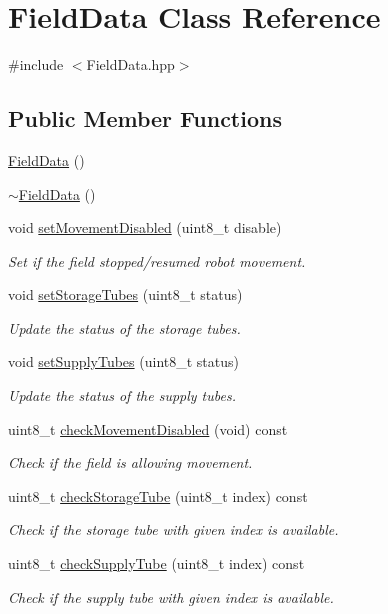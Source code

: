 \hypertarget{class_field_data}{}\section{Field\+Data Class Reference}
\label{class_field_data}


{\ttfamily \#include $<$Field\+Data.\+hpp$>$}

\subsection*{Public Member Functions}
\begin{DoxyCompactItemize}
\item 
\hyperlink{class_field_data_a53bb54569b22ffac4bce51a72e949d3d}{Field\+Data} ()
\item 
\hyperlink{class_field_data_a1dc5aaecde15432e78ec3c6fbd640c24}{$\sim$\+Field\+Data} ()
\item 
void \hyperlink{class_field_data_a04b6872f909539d5667adfb584b659ed}{set\+Movement\+Disabled} (uint8\+\_\+t disable)
\begin{DoxyCompactList}\small\item\em Set if the field stopped/resumed robot movement. \end{DoxyCompactList}\item 
void \hyperlink{class_field_data_a00f9ea01f43a5d261962df7d87da7a74}{set\+Storage\+Tubes} (uint8\+\_\+t status)
\begin{DoxyCompactList}\small\item\em Update the status of the storage tubes. \end{DoxyCompactList}\item 
void \hyperlink{class_field_data_a4dcddb152c65524e6c51ec74737f0c66}{set\+Supply\+Tubes} (uint8\+\_\+t status)
\begin{DoxyCompactList}\small\item\em Update the status of the supply tubes. \end{DoxyCompactList}\item 
uint8\+\_\+t \hyperlink{class_field_data_ab43f0866e57dbdb05d56550a6ab1e8e0}{check\+Movement\+Disabled} (void) const
\begin{DoxyCompactList}\small\item\em Check if the field is allowing movement. \end{DoxyCompactList}\item 
uint8\+\_\+t \hyperlink{class_field_data_aace8d0ab4c931b35ab85b71710079459}{check\+Storage\+Tube} (uint8\+\_\+t index) const
\begin{DoxyCompactList}\small\item\em Check if the storage tube with given index is available. \end{DoxyCompactList}\item 
uint8\+\_\+t \hyperlink{class_field_data_a645f5d698b0048e4aa718327a5e1550a}{check\+Supply\+Tube} (uint8\+\_\+t index) const
\begin{DoxyCompactList}\small\item\em Check if the supply tube with given index is available. \end{DoxyCompactList}\end{DoxyCompactItemize}
